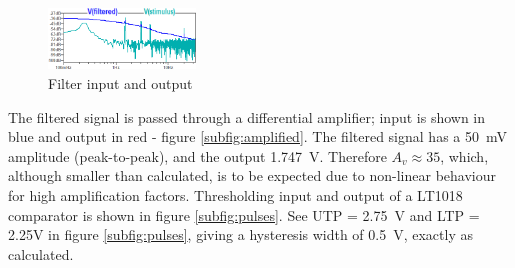  
\begin{figure}
\centering
\includegraphics[width=0.35\textwidth]{./Figures/filtout}
\caption{Filter input and output}
\label{fig:filtout}
\end{figure}

The filtered signal is passed through a differential amplifier; input is shown in blue and output in red - figure \ref{subfig:amplified}. The filtered signal has a \SI{50}{mV} amplitude (peak-to-peak), and the output \SI{1.747}{V}. Therefore $A_v \approx 35$, which, although smaller than calculated, is to be expected due to non-linear behaviour for high amplification factors. Thresholding input and output of a LT1018 comparator is shown in figure \ref{subfig:pulses}.  See UTP = \SI{2.75}{V} and LTP = {2.25}{V} in figure \ref{subfig:pulses}, giving a hysteresis width of \SI{0.5}{V}, exactly as calculated.

